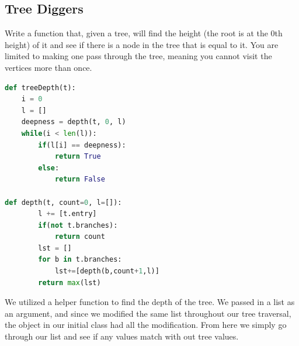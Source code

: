 \documentclass{article}
\begin{document}
 \subsection{Tree Diggers}
 Write a function that, given a tree, will find the height (the root is at the 0th height) of it and see if there is a node in the tree that is equal to it. You are limited to making one pass through the tree, meaning you cannot visit the vertices more than once.
 \begin{solution}
 \begin{lstlisting}[language = Python]
def treeDepth(t):
    i = 0
    l = []
    deepness = depth(t, 0, l)
    while(i < len(l)):
        if(l[i] == deepness):
            return True
        else:
            return False

def depth(t, count=0, l=[]):
        l += [t.entry]
        if(not t.branches):
            return count
        lst = []
        for b in t.branches:
            lst+=[depth(b,count+1,l)]
        return max(lst)
\end{lstlisting}
We utilized a helper function to find the depth of the tree. We passed in a list as an argument, and since we modified the same list throughout our tree traversal, the object in our initial class had all the modification. From here we simply go through our list and see if any values match with out tree values.
 \end{solution}
\end{document}
